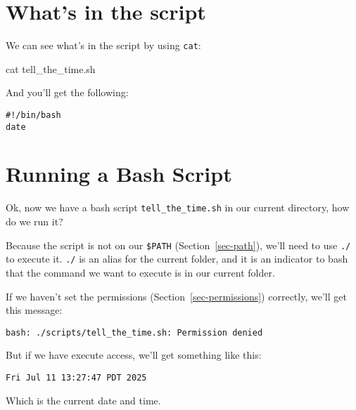 \documentclass[
  letterpaper,
  DIV=11,
  numbers=noendperiod]{scrreprt}
\newenvironment{Shaded}{\begin{snugshade}}{\end{snugshade}}
\newcommand{\ExtensionTok}[1]{\textcolor[rgb]{0.00,0.23,0.31}{#1}}
\newcommand{\FunctionTok}[1]{\textcolor[rgb]{0.28,0.35,0.67}{#1}}
\newcommand{\NormalTok}[1]{\textcolor[rgb]{0.00,0.23,0.31}{#1}}
\begin{document}
\section{What's in the script}\label{whats-in-the-script}

We can see what's in the script by using \texttt{cat}:

\begin{Shaded}
\begin{Highlighting}[]
\FunctionTok{cat}\NormalTok{ tell\_the\_time.sh}
\end{Highlighting}
\end{Shaded}

And you'll get the following:

\begin{verbatim}
#!/bin/bash
date
\end{verbatim}

\section{Running a Bash Script}\label{running-a-bash-script}

Ok, now we have a bash script \texttt{tell\_the\_time.sh} in our current
directory, how do we run it?

Because the script is not on our \texttt{\$PATH}
(Section~\ref{sec-path}), we'll need to use \texttt{./} to execute it.
\texttt{./} is an alias for the current folder, and it is an indicator
to bash that the command we want to execute is in our current folder.

\begin{Shaded}
\end{Shaded}

If we haven't set the permissions (Section~\ref{sec-permissions})
correctly, we'll get this message:

\begin{verbatim}
bash: ./scripts/tell_the_time.sh: Permission denied
\end{verbatim}

But if we have execute access, we'll get something like this:

\begin{verbatim}
Fri Jul 11 13:27:47 PDT 2025
\end{verbatim}

Which is the current date and time.
\end{document}
